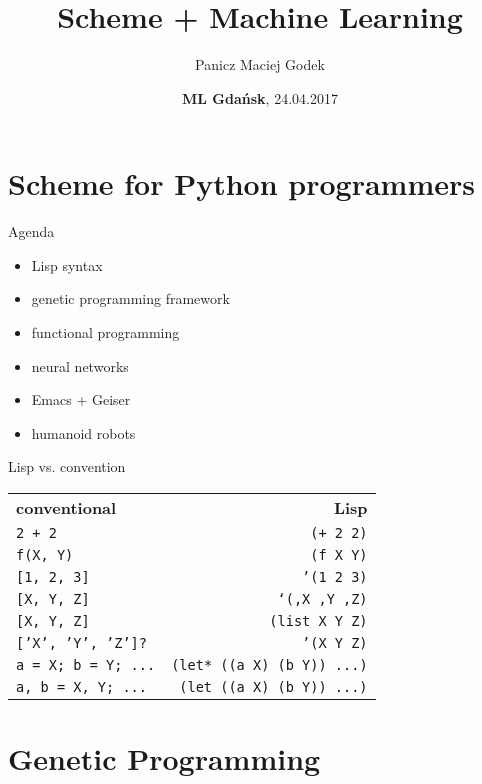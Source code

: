 \documentclass{beamer}
\title{\textbf{Scheme + Machine Learning}}
\author{Panicz Maciej Godek}
\institute{
  \tiny{\href{mailto:godek.maciek@gmail.com}{\textbf{godek.maciek@gmail.com}}} \\
  \normalsize{\url{https://github.com/panicz/writings/tree/master/talks/mlgdansk}}
}
\date{\textbf{ML Gdańsk}, 24.04.2017}
\begin{document}
\begin{frame}
  \titlepage
\end{frame}

\section{Scheme for Python programmers}

\begin{frame}{Agenda}
  \begin{itemize} \pause
  \item Lisp syntax \pause
  \item genetic programming framework \pause
  \item functional programming \pause
  \item neural networks \pause
  \item Emacs + Geiser \pause
  \item humanoid robots
  \end{itemize}
\end{frame}


\begin{frame}{Lisp vs. convention}
  \begin{tabular}{ l r }
    \textbf{conventional} & \textbf{Lisp} \\ \pause
    \texttt{2 + 2} & \texttt{(+ 2 2)} \\ \pause
    \texttt{f(X, Y)} & \texttt{(f X Y)} \\ \pause
    \texttt{[1, 2, 3]} & \texttt{'(1 2 3)} \\ \pause
    \texttt{[X, Y, Z]} & \texttt{`(,X ,Y ,Z)} \\ \pause
    \texttt{[X, Y, Z]} & \texttt{(list X Y Z)} \\ \pause
    \texttt{['X', 'Y', 'Z']?} & \texttt{'(X Y Z)} \\ \pause
    \texttt{a = X; b = Y; ...} & \texttt{(let* ((a X) (b Y)) ...)} \\ \pause
    \texttt{a, b = X, Y; ...} & \texttt{(let ((a X) (b Y)) ...)} \\
  \end{tabular}
\end{frame}

\section{Genetic Programming}
\end{document}
